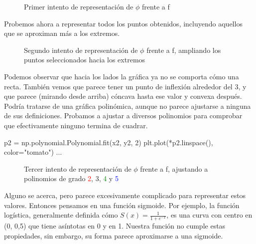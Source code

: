 \documentclass[12pt, a4paper, titlepage]{article}
\begin{document}
  \begin{figure}[H]
    \hspace{2.5em} 
    \caption{Primer intento de representación de $\phi$ frente a f}
  \end{figure}

  Probemos ahora a representar todos los puntos obtenidos, incluyendo aquellos que se aproximan más a los extremos.

  \begin{figure}[H]
    \hspace{2.5em} 
    \caption{Segundo intento de representación de $\phi$ frente a f, ampliando los puntos seleccionados hacia los extremos}
  \end{figure}

  Podemos observar que hacia los lados la gráfica ya no se comporta cómo una recta. También vemos que parece tener un punto de inflexión alrededor del 3, y que parece (mirando desde arriba) cóncava hasta ese valor y convexa después. Podría tratarse de una gráfica polinómica, aunque no parece ajustarse a ninguna de sus definiciones. Probamos a ajustar a diversos polinomios para comprobar que efectivamente ninguno termina de cuadrar.

  \begin{python}
    p2 = np.polynomial.Polynomial.fit(x2, y2, 2)
    plt.plot(*p2.linspace(), color="tomato")
    ...
  \end{python}

  \begin{figure}[H]
    \hspace{2.5em} 
    \caption{Tercer intento de representación de $\phi$ frente a f, ajustando a polinomios de grado \textcolor{Red}{2}, \textcolor{Golden}{3}, \textcolor{Green}{4} y \textcolor{Blue}{5}}
  \end{figure}

  Alguno se acerca, pero parece excesivamente complicado para representar estos valores. Entonces pensamos en una función sigmoide. Por ejemplo, la función logística, generalmente definida cómo $S(x) = \frac{1}{1+e^{-x}}$, es una curva con centro en (0, 0,5) que tiene asíntotas en 0 y en 1. Nuestra función no cumple estas propiedades, sin embargo, su forma parece aproximarse a una sigmoide.
\end{document}
